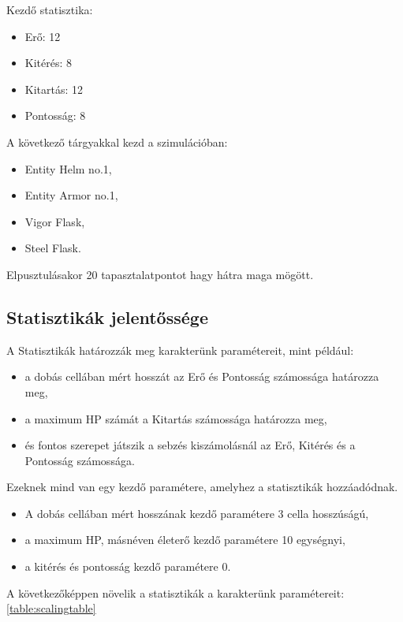 \noindent Kezdő statisztika:
\begin{itemize}
    \item Erő: 12
    \item Kitérés: 8
    \item Kitartás: 12
    \item Pontosság: 8
\end{itemize}

\noindent A következő tárgyakkal kezd a szimulációban:

\begin{itemize}
    \item Entity Helm no.1,
    \item Entity Armor no.1,
    \item Vigor Flask,
    \item Steel Flask.
\end{itemize}

\noindent Elpusztulásakor 20 tapasztalatpontot hagy hátra maga mögött.

\subsection{Statisztikák jelentőssége}

A Statisztikák határozzák meg karakterünk paramétereit, mint például:
\begin{itemize}
    \item a dobás cellában mért hosszát az Erő és Pontosság számossága határozza meg,
    \item a maximum HP számát a Kitartás számossága határozza meg,
    \item és fontos szerepet játszik a sebzés kiszámolásnál az Erő, Kitérés és a Pontosság számossága.
\end{itemize}

\noindent Ezeknek mind van egy kezdő paramétere, amelyhez a statisztikák hozzáadódnak.

\begin{itemize}
    \item \label{Dobás} A dobás cellában mért hosszának kezdő paramétere 3 cella hosszúságú,
    \item a maximum HP, másnéven életerő kezdő paramétere 10 egységnyi,
    \item a kitérés és pontosság kezdő paramétere 0.
\end{itemize}

\noindent A következőképpen növelik a statisztikák a karakterünk paramétereit: \ref{table:scalingtable}

